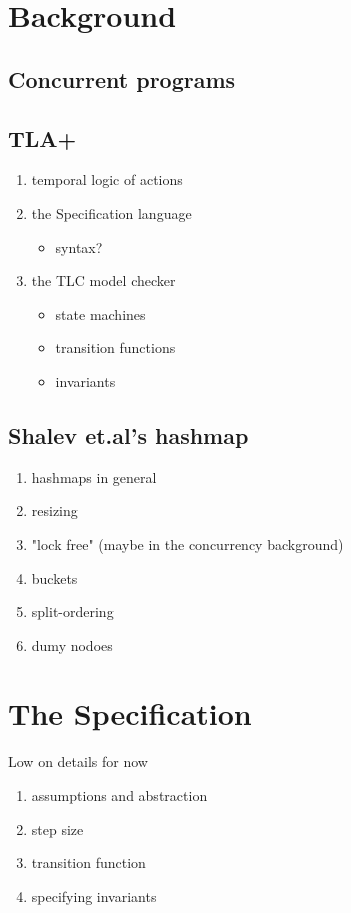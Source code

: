 \documentclass[journal]{IEEEtran}
\begin{document}
\section{Background}

\subsection{Concurrent programs}
\subsection{TLA+}
    \begin{enumerate}
        \item temporal logic of actions
        \item the Specification language
        \begin{itemize}
            \item syntax?
        \end{itemize}
        \item the TLC model checker
        \begin{itemize}
            \item state machines
            \item transition functions
            \item invariants
        \end{itemize}
    \end{enumerate}
\subsection{Shalev et.al's hashmap}
    \begin{enumerate}
        \item hashmaps in general
        \item resizing
        \item "lock free" (maybe in the concurrency background)
        \item buckets
        \item split-ordering
        \item dumy nodoes
    \end{enumerate}

\section{The Specification}
Low on details for now
    \begin{enumerate}
        \item assumptions and abstraction
        \item step size
        \item transition function
        \item specifying invariants
    \end{enumerate}
\end{document}
